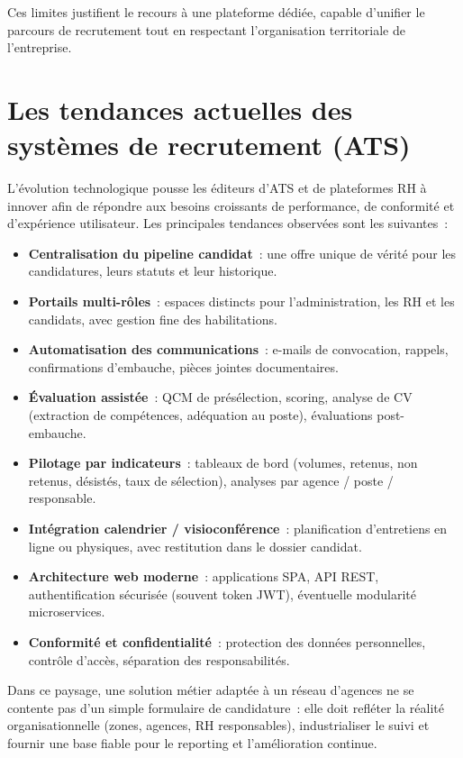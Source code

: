 Ces limites justifient le recours à une plateforme dédiée, capable d'unifier le
parcours de recrutement tout en respectant l'organisation territoriale de l'entreprise.


\section{Les tendances actuelles des systèmes de recrutement (ATS)}

L'évolution technologique pousse les éditeurs d'ATS et de plateformes RH à innover
afin de répondre aux besoins croissants de performance, de conformité et d'expérience
utilisateur. Les principales tendances observées sont les suivantes~:

\begin{itemize}
  \item \textbf{Centralisation du pipeline candidat}~: une offre unique de vérité pour
        les candidatures, leurs statuts et leur historique.
  \item \textbf{Portails multi-rôles}~: espaces distincts pour l'administration, les RH
        et les candidats, avec gestion fine des habilitations.
  \item \textbf{Automatisation des communications}~: e-mails de convocation, rappels,
        confirmations d'embauche, pièces jointes documentaires.
  \item \textbf{Évaluation assistée}~: QCM de présélection, scoring, analyse de CV
        (extraction de compétences, adéquation au poste), évaluations post-embauche.
  \item \textbf{Pilotage par indicateurs}~: tableaux de bord (volumes, retenus,
        non retenus, désistés, taux de sélection), analyses par agence / poste /
        responsable.
  \item \textbf{Intégration calendrier / visioconférence}~: planification d'entretiens
        en ligne ou physiques, avec restitution dans le dossier candidat.
  \item \textbf{Architecture web moderne}~: applications SPA, API REST, authentification
        sécurisée (souvent token JWT), éventuelle modularité microservices.
  \item \textbf{Conformité et confidentialité}~: protection des données personnelles,
        contrôle d'accès, séparation des responsabilités.
\end{itemize}

Dans ce paysage, une solution \og{}métier\fg{} adaptée à un réseau d'agences ne se
contente pas d'un simple formulaire de candidature~: elle doit refléter la réalité
organisationnelle (zones, agences, RH responsables), industrialiser le suivi et
fournir une base fiable pour le reporting et l'amélioration continue.


